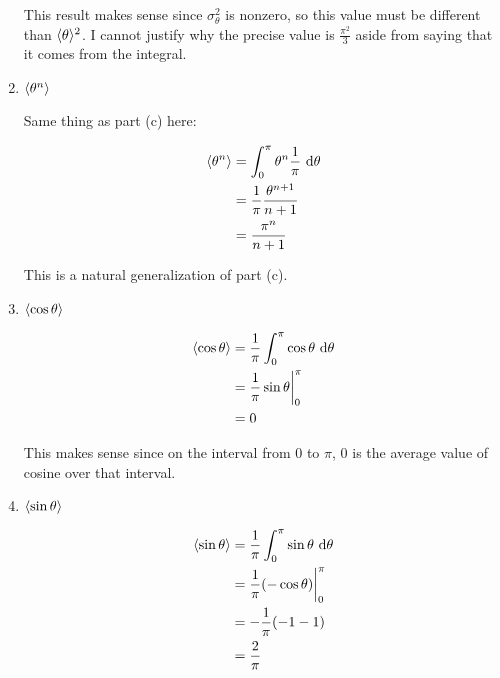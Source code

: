 \documentclass{article}
\begin{document}
\begin{enumerate}[label=(\alph*)]
\begin{solution}
        This result makes sense since $\sigma_\theta^2$ is nonzero, so this value must be different than $\langle \theta \rangle^2$. I cannot justify why the precise value is $\frac{\pi^2}{3}$ aside from saying that it comes from the integral.
    \end{solution}


    \item $\langle \theta^n \rangle$
    
    \begin{solution}
        Same thing as part (c) here:

        \begin{align*}
            \langle \theta^n \rangle &= \int_0^\pi \theta^n \frac{1}{\pi} \ \mathrm d \theta \\
            &= \frac{1}{\pi} \frac{\theta^{n+1}}{n+1}\\
            &= \frac{\pi^{n}}{n + 1}
        \end{align*}

        This is a natural generalization of part (c).
    \end{solution}


    \item $\langle \cos \theta \rangle$
    
    \begin{solution}
        \begin{align*}
        \langle \cos \theta \rangle &= \frac{1}{\pi} \int_0^\pi \cos \theta  \ \mathrm d \theta \\
        &= \frac{1}{\pi} \sin \theta \bigg|_0^\pi\\
        &= 0
        \end{align*}

        This makes sense since on the interval from $0$ to $\pi$, $0$ is the average value of cosine over that interval.
    \end{solution}


    \item $\langle \sin \theta \rangle$
    
    \begin{solution}
        \begin{align*}
            \langle \sin\theta \rangle &= \frac{1}{\pi} \int_0^\pi \sin \theta \ \mathrm d \theta\\
            &= \frac{1}{\pi}(- \cos \theta)\bigg|_0^\pi\\
            &= -\frac{1}{\pi} (-1 -1)\\
            &= \frac{2}{\pi}
        \end{align*}


\end{solution}
\end{enumerate}
\end{document}
